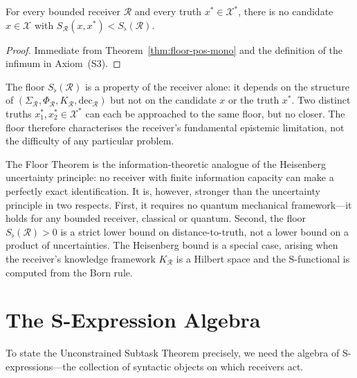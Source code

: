 \begin{corollary}\label{cor:smallest-knowable-mono}
For every bounded receiver $\mathcal{R}$ and every truth
$x^{*} \in \mathcal{X}^{*}$, there is no candidate $x \in \mathcal{X}$
with $S_{\mathcal{R}}(x, x^{*}) < S_{\flat}(\mathcal{R})$.
\end{corollary}

\begin{proof}
Immediate from Theorem~\ref{thm:floor-pos-mono} and the definition of the
infimum in Axiom~(S3).
\end{proof}

\begin{remark}
The floor $S_{\flat}(\mathcal{R})$ is a property of the receiver alone: it
depends on the structure of $(\Sigma_{\mathcal{R}}, \Phi_{\mathcal{R}},
K_{\mathcal{R}}, \mathrm{dec}_{\mathcal{R}})$ but not on the candidate $x$
or the truth $x^{*}$.  Two distinct truths $x_1^{*}, x_2^{*} \in
\mathcal{X}^{*}$ can each be approached to the same floor, but no closer.
The floor therefore characterises the receiver's fundamental epistemic
limitation, not the difficulty of any particular problem.
\end{remark}

\begin{remark}
The Floor Theorem is the information-theoretic analogue of the Heisenberg
uncertainty principle: no receiver with finite information capacity can make
a perfectly exact identification.  It is, however, stronger than the
uncertainty principle in two respects.  First, it requires no quantum
mechanical framework---it holds for any bounded receiver, classical or quantum.
Second, the floor $S_{\flat}(\mathcal{R}) > 0$ is a strict lower bound on
distance-to-truth, not a lower bound on a product of uncertainties.  The
Heisenberg bound is a special case, arising when the receiver's knowledge
framework $K_{\mathcal{R}}$ is a Hilbert space and the S-functional is
computed from the Born rule.
\end{remark}

\section{The S-Expression Algebra}
\label{sec:ch14-expressions}

To state the Unconstrained Subtask Theorem precisely, we need the algebra of
S-expressions---the collection of syntactic objects on which receivers act.

